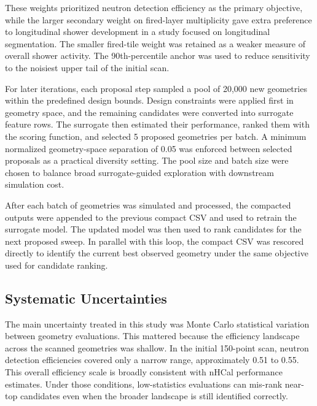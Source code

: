 \noindent These weights prioritized neutron detection efficiency as the primary objective, while the larger secondary weight on fired-layer multiplicity gave extra preference to longitudinal shower
development in a study focused on longitudinal segmentation. The smaller fired-tile weight was retained as a weaker measure of overall shower activity. The 90th-percentile anchor was used
to reduce sensitivity to the noisiest upper tail of the initial scan.

\noindent For later iterations, each proposal step sampled a pool of 20,000 new geometries within the predefined design bounds. Design constraints were applied first in geometry space, and the remaining candidates were converted into surrogate feature rows. The surrogate then estimated their performance, ranked them with the scoring function, and selected 5 proposed geometries per batch. A minimum normalized geometry-space separation of 0.05 was enforced between selected proposals as a practical diversity setting. The pool size and batch size were chosen to balance broad surrogate-guided exploration with downstream simulation cost.

\noindent After each batch of geometries was simulated and processed, the compacted outputs were appended to the previous compact CSV and used to retrain the surrogate model. The updated model
was then used to rank candidates for the next proposed sweep. In parallel with this loop, the compact CSV was rescored directly to identify the current best observed geometry under the same objective
used for candidate ranking.

\subsection{Systematic Uncertainties}

\noindent The main uncertainty treated in this study was Monte Carlo statistical variation between geometry evaluations.
This mattered because the efficiency landscape across the scanned geometries was shallow. In the initial 150-point scan, neutron detection efficiencies covered only
a narrow range, approximately 0.51 to 0.55. This overall efficiency scale is broadly consistent with nHCal performance estimates\cite{BrandenburgRiedl:2025nhcalpdr}. Under those conditions, low-statistics
evaluations can mis-rank near-top candidates even when the broader landscape is still identified correctly.

